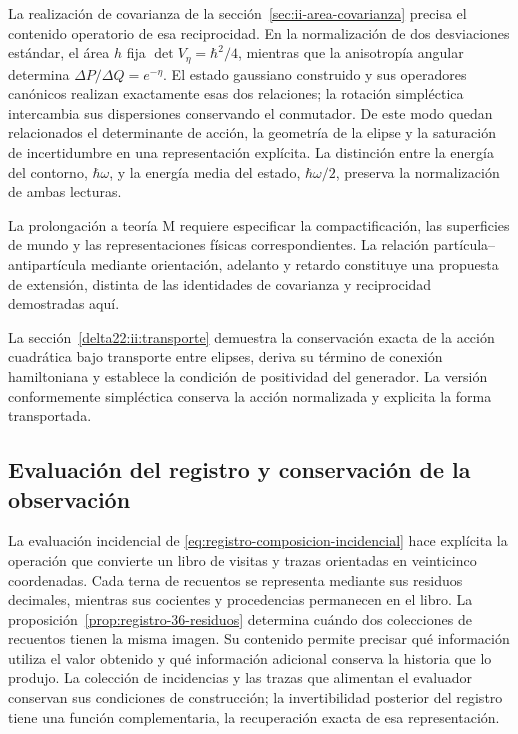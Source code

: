 La realización de covarianza de la
sección~\ref{sec:ii-area-covarianza} precisa el contenido operatorio de
esa reciprocidad. En la normalización de dos desviaciones estándar,
el área \(h\) fija
\(\det V_\eta=\hbar^2/4\), mientras que la anisotropía angular determina
\(\Delta P/\Delta Q=e^{-\eta}\). El estado gaussiano construido y sus
operadores canónicos realizan exactamente esas dos relaciones; la
rotación simpléctica intercambia sus dispersiones conservando el
conmutador. De este modo quedan relacionados el determinante de acción,
la geometría de la elipse y la saturación de incertidumbre en una
representación explícita. La distinción entre la energía del contorno,
\(\hbar\omega\), y la energía media del estado,
\(\hbar\omega/2\), preserva la normalización de ambas lecturas.

La prolongación a teoría M requiere especificar la compactificación,
las superficies de mundo y las representaciones físicas correspondientes.
La relación partícula--antipartícula mediante orientación, adelanto y
retardo constituye una propuesta de extensión, distinta de las
identidades de covarianza y reciprocidad demostradas aquí.

La sección~\ref{delta22:ii:transporte} demuestra la conservación
exacta de la acción cuadrática bajo transporte entre elipses, deriva
su término de conexión hamiltoniana y establece la condición de
positividad del generador. La versión conformemente simpléctica
conserva la acción normalizada y explicita la forma transportada.

\subsection{Evaluación del registro y conservación de la observación}

La evaluación incidencial de
\eqref{eq:registro-composicion-incidencial} hace explícita la operación
que convierte un libro de visitas y trazas orientadas en veinticinco
coordenadas. Cada terna de recuentos se representa mediante sus residuos
decimales, mientras sus cocientes y procedencias permanecen en el libro.
La proposición~\ref{prop:registro-36-residuos} determina cuándo dos
colecciones de recuentos tienen la misma imagen. Su contenido permite
precisar qué información utiliza el valor obtenido y qué información
adicional conserva la historia que lo produjo. La colección de incidencias
y las trazas que alimentan el evaluador conservan sus condiciones de
construcción; la invertibilidad posterior del registro tiene una función
complementaria, la recuperación exacta de esa representación.

